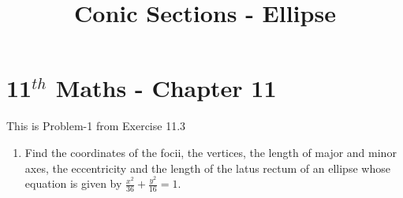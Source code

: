 \documentclass[12pt]{article}
\begin{document}
\begin{center}
\title{\textbf{Conic Sections - Ellipse}}
\date{\vspace{-5ex}} %
\maketitle
\end{center}
\setcounter{page}{1}

\section{11$^{th}$ Maths - Chapter 11}
This is Problem-1 from Exercise 11.3
\begin{enumerate}
\item Find the coordinates of the focii, the vertices, the length of major and minor axes, the eccentricity and the length of the latus rectum of an ellipse whose equation is given by $\frac{x^2}{36}+\frac{y^2}{16}=1$.


\end{enumerate}
\end{document}
